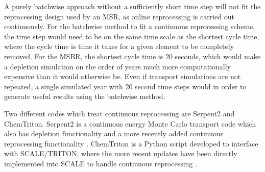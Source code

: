 A purely batchwise approach without a sufficiently short time step will not fit the reprocessing design used by an MSR, as online reprocessing is carried out continuously. 
For the batchwise method to fit a continuous reprocessing scheme, the time step would need to be on the same time scale as the shortest cycle time, where the cycle time is time it takes for a given element to be completely removed.
For the MSBR, the shortest cycle time is 20 seconds, which would make a depletion simulation on the order of years much more computationally expensive than it would otherwise be. Even if transport simulations are not repeated, a single simulated year with 20 second time steps would  in order to generate useful results using the batchwise method.



Two different codes which treat continuous reprocessing are Serpent2 and ChemTriton. Serpent2 is a continuous energy Monte Carlo transport code which also has depletion functionality and a more recently added continuous reprocessing functionality \cite{aufiero_extended_2013}. ChemTriton is a Python script developed to interface with SCALE/TRITON, where the more recent updates have been directly implemented into SCALE to handle continuous reprocessing \cite{jr_vicente_valdez_modeling_2020}.

